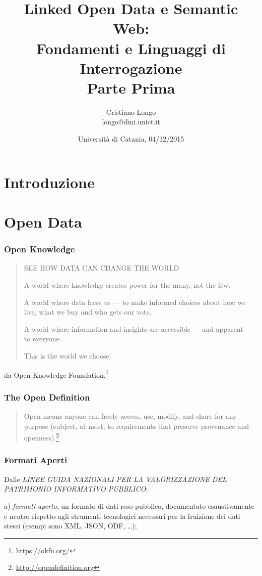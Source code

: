 \documentclass[8pt]{beamer}
\title{Linked Open Data e Semantic Web:\\
Fondamenti e Linguaggi di Interrogazione\\
Parte Prima}
\author{Cristiano Longo\\ 
{\small{longo@dmi.unict.it}}}
\date{Universit\`a di Catania, 04/12/2015}
\begin{document}
\maketitle
\setcounter{tocdepth}{1}

\section{Introduzione}

\section{Open Data}
\begin{frame}
	\frametitle{Open Knowledge}
	\begin{quote}
SEE HOW DATA CAN CHANGE THE WORLD

A world where knowledge creates power for the many, not the few.

A world where data frees us — to make informed choices about how we live, what we buy and who gets our vote.

A world where information and insights are accessible — and apparent — to everyone.

This is the world we choose.	
	\end{quote}
	
	da Open Knowledge Foundation.\footnote{https://okfn.org/}
\end{frame}

\begin{frame}
\frametitle{The Open Definition}

\begin{quote}
Open means anyone can freely access, use, modify, and share for any purpose (subject, at most, to requirements that preserve provenance and openness).\footnote{\url{http://opendefinition.org}} 
\end{quote}
\end{frame}

\begin{frame}
\frametitle{Formati Aperti}

Dalle \emph{LINEE GUIDA NAZIONALI PER LA VALORIZZAZIONE DEL PATRIMONIO
INFORMATIVO PUBBLICO}:
\vspace{\baselineskip}

a) \emph{formati aperto}, un formato di dati reso pubblico, documentato
esaustivamente e neutro rispetto agli strumenti tecnologici necessari per la fruizione dei dati stessi (esempi sono
XML, JSON, ODF, \ldots);

\end{frame}
\end{document}
